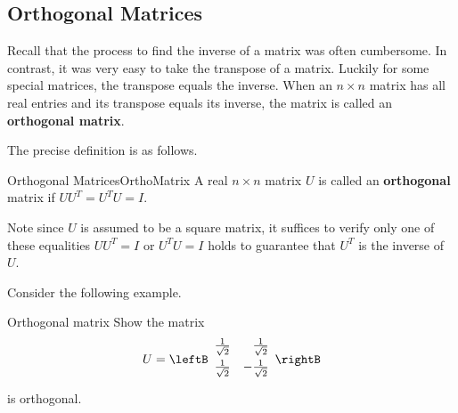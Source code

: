 \subsection{Orthogonal Matrices}

Recall that the process to find the inverse of a matrix was often cumbersome. 
In contrast, it was very easy to take the transpose of a matrix. Luckily for some special
matrices, the transpose equals the inverse. When an $n \times n$ matrix has all real
entries and its transpose equals its inverse, the matrix is called an \textbf{orthogonal matrix}. 

The precise definition is as follows. 

\begin{definition}{Orthogonal Matrices}{OrthoMatrix}
A real $n\times n$ matrix $U$ is called an
 \textbf{orthogonal} matrix if $UU^{T}=U^{T}U=I.$
\end{definition}

Note since $U$ is assumed to be a square matrix, it suffices to verify
only one of these equalities $UU^{T}=I$ or $U^{T}U=I$ holds to
guarantee that $U^T$ is the inverse of $U$.

Consider the following example. 

\begin{example}{Orthogonal matrix}{}
Show the matrix
\begin{equation*}
U=\leftB
\begin{array}{rr}
\vspace{0.05in}\frac{1}{\sqrt{2}} & \frac{1}{\sqrt{2}} \\
\vspace{0.05in}\frac{1}{\sqrt{2}} & -\frac{1}{\sqrt{2}}
\end{array}
\rightB
\end{equation*}
is orthogonal.
\end{example}

